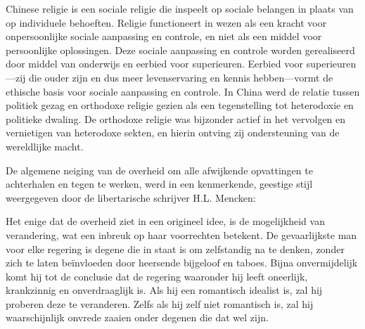 \documentclass[
  a5paper,
  smalldemyvopaper,10pt,twoside,onecolumn,openright,extrafontsizes,hidelinks]{memoir}
\renewenvironment{quote}%
               {\list{}{\rightmargin=.6cm\leftmargin=.6cm}%
                \itshape \item[]}%
               {\endlist}
\begin{document}
\begin{quote}
Chinese religie is een sociale religie die inspeelt op sociale belangen
in plaats van op individuele behoeften. Religie functioneert in wezen
als een kracht voor onpersoonlijke sociale aanpassing en controle, en
niet als een middel voor persoonlijke oplossingen. Deze sociale
aanpassing en controle worden gerealiseerd door middel van onderwijs en
eerbied voor superieuren. Eerbied voor superieuren---zij die ouder zijn
en dus meer levenservaring en kennis hebben---vormt de ethische basis
voor sociale aanpassing en controle. In China werd de relatie tussen
politiek gezag en orthodoxe religie gezien als een tegenstelling tot
heterodoxie en politieke dwaling. De orthodoxe religie was bijzonder
actief in het vervolgen en vernietigen van heterodoxe sekten, en hierin
ontving zij ondersteuning van de wereldlijke macht.
\end{quote}

De algemene neiging van de overheid om alle afwijkende opvattingen te
achterhalen en tegen te werken, werd in een kenmerkende, geestige stijl
weergegeven door de libertarische schrijver H.L. Mencken:

\begin{quote}
Het enige dat de overheid ziet in een origineel idee, is de mogelijkheid
van verandering, wat een inbreuk op haar voorrechten betekent. De
gevaarlijkste man voor elke regering is degene die in staat is om
zelfstandig na te denken, zonder zich te laten beïnvloeden door
heersende bijgeloof en taboes. Bijna onvermijdelijk komt hij tot de
conclusie dat de regering waaronder hij leeft oneerlijk, krankzinnig en
onverdraaglijk is. Als hij een romantisch idealist is, zal hij proberen
deze te veranderen. Zelfs als hij zelf niet romantisch is, zal hij
waarschijnlijk onvrede zaaien onder degenen die dat wel zijn.
\end{quote}
\end{document}
